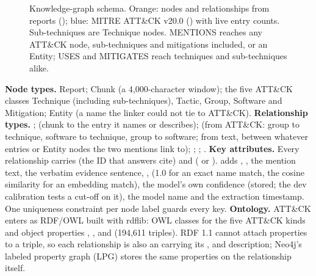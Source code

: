 \documentclass[10pt]{article}
\begin{document}
\begin{figure}[tb]
\caption{Knowledge-graph schema. Orange: nodes and relationships from reports (); blue: MITRE ATT\&CK v20.0 () with live entry counts. Sub-techniques are Technique nodes. MENTIONS reaches any ATT\&CK node, sub-techniques and mitigations included, or an Entity; USES and MITIGATES reach techniques and sub-techniques alike.}\label{fig:schema}
\end{figure}
\textbf{Node types.} Report; Chunk (a 4,000-character window); the five ATT\&CK classes Technique (including sub-techniques), Tactic, Group, Software and Mitigation; Entity (a name the linker could not tie to ATT\&CK).
\textbf{Relationship types.} ;  (chunk to the entry it names or describes);  (from ATT\&CK: group to technique, software to technique, group to software; from text, between whatever entries or Entity nodes the two mentions link to); ; ; .
\textbf{Key attributes.} Every relationship carries  (the ID that answers cite) and  ( or ).  adds , , the mention text, the verbatim evidence sentence, ,  (1.0 for an exact name match, the cosine similarity for an embedding match), the model's own confidence (stored; the dev calibration tests a cut-off on it), the model name and the extraction timestamp. One uniqueness constraint per node label guards every key.
\textbf{Ontology.} ATT\&CK enters as RDF/OWL built with rdflib: OWL classes for the five ATT\&CK kinds and object properties , ,  and  (194,611 triples). RDF 1.1 cannot attach properties to a triple, so each relationship is also an  carrying its ,  and description; Neo4j's labeled property graph (LPG) stores the same properties on the relationship itself.
\end{document}
